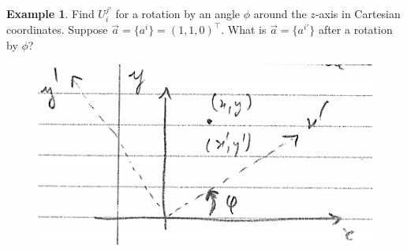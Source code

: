\documentclass{book}
\theoremstyle{definition}
\newtheorem{exmp}{Example}[section]
\begin{document}
\begin{exmp}
	Find $U^{j'}_i$ for a rotation by an angle $\phi$ around the $z$-axis in Cartesian coordinates. Suppose $\vec{a} = \{a^i \}= (1,1,0)^\top$. What is $\vec{a} = \{ a^{i'}\}$ after a rotation by $\phi$?

	\begin{figure}[!htb]
		\centering
		\includegraphics[scale=0.6]{transf}
	\end{figure}


\end{exmp}
\end{document}
